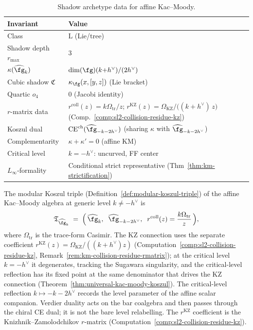 \begin{table}[ht]
\centering
\small
\caption{Shadow archetype data for affine
Kac--Moody.}\label{tab:km-shadow-archetype}
\begin{tabular}{ll}
\toprule
\textbf{Invariant} & \textbf{Value} \\
\midrule
Class & L (Lie/tree) \\
Shadow depth $r_{\max}$ & $3$ \\
$\kappa(\widehat{\fg}_k)$ &
 $\dim(\fg)(k{+}h^\vee)/(2h^\vee)$ \\
Cubic shadow $\mathfrak{C}$ &
 $\kappa_{\fg}(x,[y,z])$ (Lie bracket) \\
Quartic $o_4$ & $0$ (Jacobi identity) \\
$r$-matrix data &
 $r^{\mathrm{coll}}(z)=k\Omega_{\mathrm{tr}}/z$;
 $r^{\mathrm{KZ}}(z)=\Omega_{\mathrm{KZ}}/\bigl((k{+}h^\vee)\,z\bigr)$
 (Comp.~\ref{comp:sl2-collision-residue-kz}) \\
Koszul dual & $\mathrm{CE}^{\mathrm{ch}}(\widehat{\fg}_{-k-2h^\vee})$
 (sharing $\kappa$ with $\widehat{\fg}_{-k-2h^\vee}$) \\
Complementarity & $\kappa + \kappa' = 0$ (affine KM) \\
Critical level & $k = -h^\vee$: uncurved,
 FF center \\
$L_\infty$-formality &
 Conditional strict representative
 (Thm~\ref{thm:km-strictification}) \\
\bottomrule
\end{tabular}
\end{table}

\noindent
The modular Koszul triple
(Definition~\ref{def:modular-koszul-triple}) of the affine
Kac--Moody algebra at generic level $k \neq -h^\vee$ is
\begin{equation}\label{eq:km-triple}
\mathfrak{T}_{\widehat{\fg}_k}
\;=\;
\Bigl(\,\widehat{\fg}_k,\;\;
\widehat{\fg}_{-k-2h^\vee},\;\;
r^{\mathrm{coll}}(z) = \frac{k\Omega_{\mathrm{tr}}}{z}\,\Bigr),
\end{equation}
where $\Omega_{\mathrm{tr}}$ is the trace-form Casimir. The KZ
connection uses the separate coefficient
$r^{\mathrm{KZ}}(z)=\Omega_{\mathrm{KZ}}/((k+h^\vee)z)$
(Computation~\ref{comp:sl2-collision-residue-kz},
Remark~\ref{rem:km-collision-residue-rmatrix});
at the critical level $k = -h^\vee$ it degenerates, tracking the
Sugawara singularity, and the critical-level reflection has its fixed
point at the same denominator that drives the KZ connection
(Theorem~\textup{\ref{thm:universal-kac-moody-koszul}}).
The critical-level reflection \(k \mapsto -k - 2h^\vee\) records the
level parameter of the affine scalar companion. Verdier duality acts
on the bar coalgebra and then passes through the chiral CE dual; it is
not the bare level relabelling. The
$r^{\mathrm{KZ}}$ coefficient is the Knizhnik--Zamolodchikov
$r$-matrix (Computation~\ref{comp:sl2-collision-residue-kz}).

